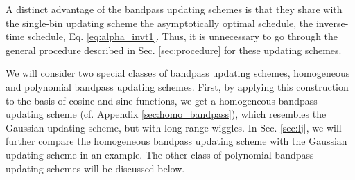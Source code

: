\documentclass[preprint, superscriptaddress, floatfix]{revtex4-1}
\newcommand{\note}[1]{{\color{DarkGreen}\footnotesize \textsc{Note.} #1}}
\begin{document}
A distinct advantage of the bandpass updating schemes
is that they share with the single-bin updating scheme
the asymptotically optimal schedule,
the inverse-time schedule, Eq. \eqref{eq:alpha_invt1}.
%
Thus, it is unnecessary to go through the general procedure
described in Sec. \ref{sec:procedure}
for these updating schemes.

We will consider two special classes of bandpass updating schemes,
homogeneous and polynomial bandpass updating schemes.
%
%
First,
by applying this construction to the basis of cosine and sine functions,
we get a homogeneous bandpass updating scheme
(cf. Appendix \ref{sec:homo_bandpass}),
which resembles the Gaussian updating scheme,
but with long-range wiggles.
%
In Sec. \ref{sec:lj},
we will further compare
the homogeneous bandpass updating scheme
with the Gaussian updating scheme
in an example.
%
%
%
The other class of polynomial bandpass updating schemes will be discussed below.

\end{document}
